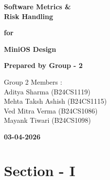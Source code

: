 \documentclass[12pt]{article}
\begin{document}
\begin{titlepage}
    \flushright %
    
    \vspace*{0.05in}
    
    \vspace{1in}
    
    {\Huge \textbf{Software Metrics \&}} \\[0.2cm]
    {\Huge \textbf{Risk Handling}} \\
    
    \vspace{0.8in}
    
    {\Large \textbf{for}} \\
    
    \vspace{0.8in}
    
    {\Huge \textbf{MiniOS Design}} \\
    
    \vfill %
    
    \vspace{1in}
    
    {\large \textbf{Prepared by Group - 2}} \\
    
    \vspace{0.8in}
    
    {\large Group 2 Members :} \\
    {\large Aditya Sharma (B24CS1119)} \\
    {\large Mehta Taksh Ashish (B24CS1115)} \\
    {\large Ved Mitra Verma (B24CS1086)} \\
    {\large Mayank Tiwari (B24CS1098)} \\
    
    \vspace{1in}
    
    {\large \textbf{03-04-2026}}
    
\end{titlepage}


\newpage
\tableofcontents
\newpage

\section{Section - I}
\end{document}
